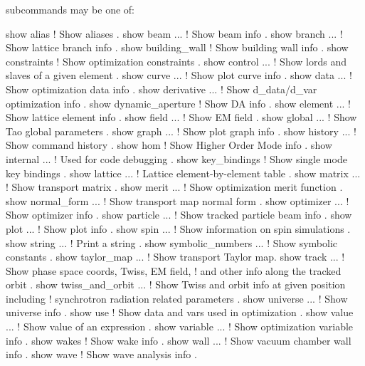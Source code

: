 {{{{{{{ subcommands may be one of:
\begin{example}
  show alias                 ! Show aliases .
  show beam ...              ! Show beam info .
  show branch ...            ! Show lattice branch info .
  show building_wall         ! Show building wall info .
  show constraints           ! Show optimization constraints .
  show control ...           ! Show lords and slaves of a given element .
  show curve ...             ! Show plot curve info .
  show data ...              ! Show optimization data info .
  show derivative ...        ! Show d_data/d_var optimization info .
  show dynamic_aperture      ! Show DA info .
  show element ...           ! Show lattice element info .
  show field ...             ! Show EM field .
  show global ...            ! Show Tao global parameters .
  show graph ...             ! Show plot graph info .
  show history ...           ! Show command history .
  show hom                   ! Show Higher Order Mode info .
  show internal ...          ! Used for code debugging .
  show key_bindings          ! Show single mode key bindings .
  show lattice ...           ! Lattice element-by-element table .
  show matrix ...            ! Show transport matrix .
  show merit ...             ! Show optimization merit function .
  show normal_form ...       ! Show transport map normal form .
  show optimizer ...         ! Show optimizer info .
  show particle ...          ! Show tracked particle beam info .
  show plot ...              ! Show plot info .
  show spin ...              ! Show information on spin simulations .
  show string ...            ! Print a string .
  show symbolic_numbers ...  ! Show symbolic constants .
  show taylor_map ...        ! Show transport Taylor map.
  show track ...             ! Show phase space coords, Twiss, EM field, 
                             !   and other info along the tracked orbit .
  show twiss_and_orbit ...   ! Show Twiss and orbit info at given position including
                             !   synchrotron radiation related parameters .
  show universe ...          ! Show universe info .
  show use                   ! Show data and vars used in optimization .
  show value ...             ! Show value of an expression .
  show variable ...          ! Show optimization variable info .
  show wakes                 ! Show wake info .
  show wall ...              ! Show vacuum chamber wall info .
  show wave                  ! Show wave analysis info .
\end{example}

}}}}}}}
